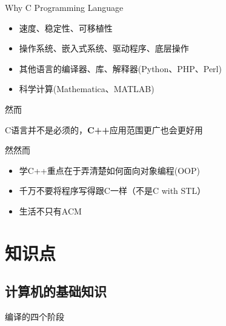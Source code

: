 \documentclass{myslide}
\begin{document}
\begin{frame}{Why C Programming Language}
\begin{itemize}
	\item 速度、稳定性、可移植性 %
	\item 操作系统、嵌入式系统、驱动程序、底层操作
	\item 其他语言的编译器、库、解释器(Python、PHP、Perl)
	\item 科学计算(Mathematica、MATLAB)
\end{itemize}
\pause 然而
\begin{center}
C语言并不是必须的，\textbf{C++}应用范围更广也会更好用
\end{center}
\pause 然然而
\begin{itemize}[<+->]
	\item 学C++重点在于弄清楚如何面向对象编程(OOP)
	\item 千万不要将程序写得跟C一样（不是C with STL）
	\item 生活不只有ACM
\end{itemize}
\end{frame}

\section{知识点}
\begin{frame}
\sectionpage
\end{frame}

\subsection{计算机的基础知识}
\begin{frame}
\subsectionpage
\end{frame}

\begin{frame}{编译的四个阶段}
\begin{center}
\end{center}
\end{frame}
\end{document}
